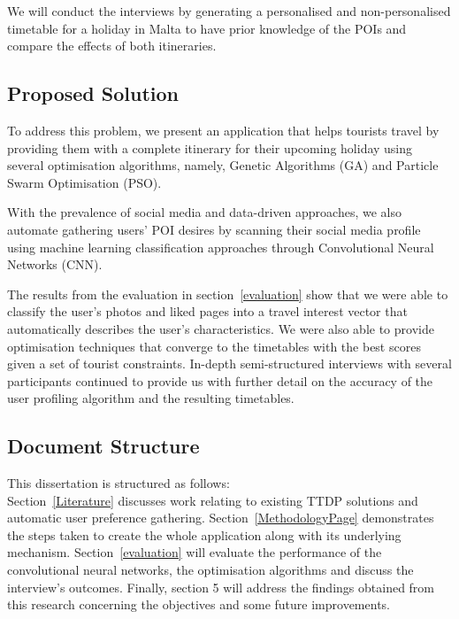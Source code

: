 We will conduct the interviews by generating a
personalised and non-personalised timetable for a
holiday in Malta to have prior knowledge of the POIs
and compare the effects of both itineraries.



\subsection{Proposed Solution}

To address this problem, we present an application
that helps tourists travel by providing them with a
complete itinerary for their upcoming holiday using
several optimisation algorithms, namely, Genetic
Algorithms (GA) and Particle Swarm Optimisation (PSO).

With the prevalence of social media and data-driven
approaches, we also automate gathering users' POI
desires by scanning their social media profile using
machine learning classification approaches through
Convolutional Neural Networks (CNN).

The results from the evaluation in  section~\ref{evaluation}
show that we were able to classify the user's photos
and liked pages into a travel interest vector that automatically
describes the user's characteristics. We were also able to provide optimisation
techniques that converge to the timetables with the
best scores given a set of tourist constraints.
In-depth semi-structured interviews with several
participants continued to provide us with further
detail on the accuracy of the user profiling algorithm
and the resulting timetables. 

\subsection{Document Structure}

This dissertation is structured as follows: \\
Section~\ref{Literature} discusses work relating to existing TTDP
solutions and automatic user preference gathering.
Section~\ref{MethodologyPage} demonstrates the steps taken to create the
whole application along with its underlying mechanism.
Section~\ref{evaluation} will evaluate the performance of the
convolutional neural networks, the optimisation
algorithms and discuss the interview's outcomes.
Finally, section 5 will address the findings obtained
from this research concerning the objectives and some
future improvements.

